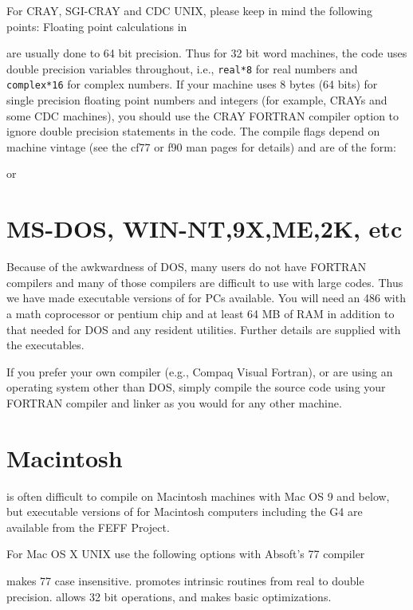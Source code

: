 \documentclass[11pt,oneside]{report} %
\begin{document}
 For CRAY, SGI-CRAY and CDC  UNIX, please keep in mind the following
points: Floating point calculations in {\feff are usually done to 64 bit
precision. Thus for 32 bit word machines, the code uses double precision
variables throughout, i.e.,
\texttt{real*8} for real numbers and \texttt{complex*16} for complex
numbers.  If your machine uses 8 bytes (64 bits) for single precision floating
point numbers and integers (for example, CRAYs and some CDC machines), you
should use the CRAY  FORTRAN compiler option to ignore double precision
statements in the code.  The compile flags depend on machine vintage
(see the cf77 or f90 man pages for details) and are of the form:
\begin{center}
or
\end{center}

\section{MS-DOS, WIN-NT,9X,ME,2K, etc}
\label{sec:Win32-users}

Because of the awkwardness of DOS, many users do not have FORTRAN
compilers and many of those compilers are difficult to use with large
codes.  Thus we have made executable versions of {\feff} for PCs
available.  You will need an 486 with a math coprocessor or pentium
chip and at least 64 MB of RAM in addition to that needed for DOS and any
resident utilities.  Further details are supplied with the
executables.

If you prefer your own compiler (e.g., Compaq Visual
Fortran), or are using an operating system other
than DOS, simply compile the source code using your FORTRAN compiler
and linker as you would for any other machine.

\section{Macintosh}
\label{sec:MAC-users}

{\feff} is often difficult to compile on Macintosh machines with
Mac OS 9 and below, but
executable versions of {\feff} for Macintosh computers including
the G4 are available from the FEFF Project.

For Mac OS X UNIX use the following options with Absoft's 77 compiler
\begin{center}
\end{center}
 makes 77 case insensitive.   
 promotes intrinsic routines from real to double precision.
 allows 32 bit operations, and  makes basic
optimizations.

}
\end{document}
